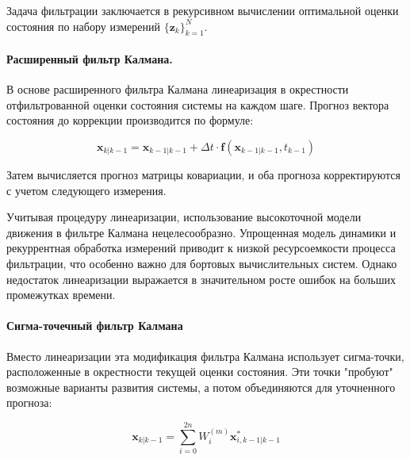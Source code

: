 Задача фильтрации заключается в рекурсивном вычислении оптимальной оценки состояния
по набору измерений $\{\mathbf{z}_k\}_{k=1}^N$. 

\paragraph{Расширенный фильтр Калмана.}
В основе расширенного фильтра Калмана линеаризация в окрестности отфильтрованной
оценки состояния системы на каждом шаге. Прогноз вектора состояния до коррекции
производится по формуле:

\begin{equation*}
    \mathbf{x}_{k|k-1} = \mathbf{x}_{k-1|k-1} 
    + \Delta t \cdot \mathbf{f} (\mathbf{x}_{k-1|k-1}, t_{k-1})
\end{equation*}

Затем вычисляется прогноз матрицы ковариации, и оба прогноза корректируются с учетом 
следующего измерения.

Учитывая процедуру линеаризации, использование высокоточной модели движения в
фильтре Калмана нецелесообразно. Упрощенная модель динамики и рекуррентная обработка
измерений приводит к низкой ресурсоемкости процесса фильтрации, что особенно важно
для бортовых вычислительных систем. Однако недостаток линеаризации выражается в значительном
росте ошибок на больших промежутках времени.

\paragraph{Сигма-точечный фильтр Калмана}
Вместо линеаризации эта модификация фильтра Калмана использует сигма-точки,
расположенные в окрестности текущей оценки состояния. Эти точки "пробуют" возможные
варианты развития системы, а потом объединяются для уточненного прогноза:

\begin{equation*}
    \mathbf{x}_{k|k-1} = \sum_{i = 0}^{2n} W_i^{(m)} \mathbf{x}^{*}_{i, k-1|k-1}
\end{equation*}